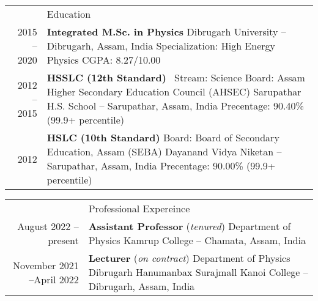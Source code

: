 \documentclass[a4paper, 11pt]{article}
\newcommand{\headingfont}{\Large\color{Bittersweet}}
\newenvironment{SectionTable}[1]{
	\renewcommand*{\arraystretch}{1.7}
	\setlength{\tabcolsep}{10pt}
	\begin{longtable}{Rp{5.2in}} & #1 \\}
{\end{longtable}\vspace{-.3cm}}
\begin{document}
\begin{SectionTable}{\headingfont Education}

2015 -- 2020 & 
\textbf{Integrated M.Sc. in Physics} \newline
Dibrugarh University -- Dibrugarh, Assam, India \newline 
Specialization: High Energy Physics \newline
CGPA: 8.27/10.00 \\


2012 -- 2015 & 
\textbf{HSSLC (12th Standard)} \ Stream: Science \newline
Board: Assam Higher Secondary Education Council (AHSEC) \newline 
Sarupathar H.S. School -- Sarupathar, Assam, India \newline
Precentage: 90.40\% (99.9+ percentile) \\

2012 &
\textbf{HSLC (10th Standard)} \newline
Board: Board of Secondary Education, Assam (SEBA) \newline 
Dayanand Vidya Niketan -- Sarupathar, Assam, India \newline
Precentage: 90.00\% (99.9+ percentile) \\


\end{SectionTable}







\begin{SectionTable}{\headingfont Professional Expereince}

August 2022 -- present & 
\textbf{Assistant Professor} (\textit{tenured}) \newline
Department of Physics\newline
Kamrup College -- Chamata, Assam, India  \\


November 2021 --April 2022 & 
\textbf{Lecturer} (\textit{on contract}) \newline
Department of Physics\newline
Dibrugarh Hanumanbax Surajmall Kanoi College -- Dibrugarh, Assam, India  \\


\end{SectionTable}
\end{document}
